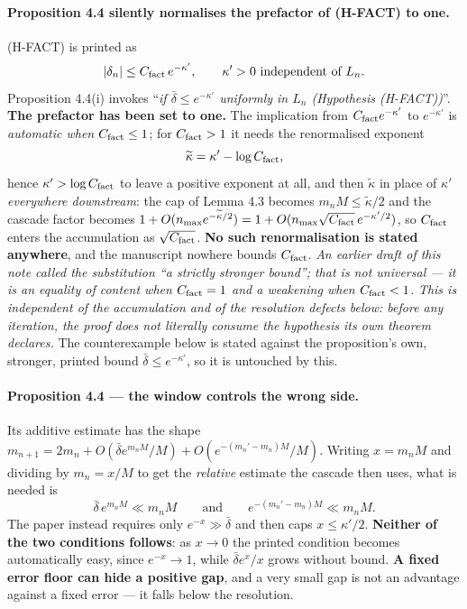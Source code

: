 \documentclass[11pt]{article}
\begin{document}
\paragraph{Proposition 4.4 silently normalises the prefactor of (H-FACT) to one.}
(H-FACT) is printed as
\[
|\delta_n|\le C_{\rm fact}\,e^{-\kappa'},\qquad
\kappa'>0\ \text{independent of }L_n .
\]
Proposition 4.4(i) invokes ``\emph{if $\bar\delta\le e^{-\kappa'}$ uniformly in $L_n$
(Hypothesis (H-FACT))}''. \textbf{The prefactor has been set to one.} The implication
from $C_{\rm fact}e^{-\kappa'}$ to $e^{-\kappa'}$ is \emph{automatic when
$C_{\rm fact}\le1$}; for $C_{\rm fact}>1$ it needs the renormalised exponent
\[
\widetilde\kappa=\kappa'-\log C_{\rm fact} ,
\]
hence \textbf{$\kappa'>\log C_{\rm fact}$} to leave a positive exponent at all, and then
$\widetilde\kappa$ in place of $\kappa'$ \emph{everywhere downstream}: the cap of
Lemma 4.3 becomes $m_nM\le\widetilde\kappa/2$ and the cascade factor becomes
$1+O(n_{\max}e^{-\widetilde\kappa/2})
=1+O(n_{\max}\sqrt{C_{\rm fact}}\,e^{-\kappa'/2})$, so $C_{\rm fact}$ enters the
accumulation as $\sqrt{C_{\rm fact}}$. \textbf{No such renormalisation is stated
anywhere}, and the manuscript nowhere bounds $C_{\rm fact}$. \emph{An earlier draft of
this note called the substitution ``a strictly stronger bound''; that is not universal
--- it is an equality of content when $C_{\rm fact}=1$ and a weakening when
$C_{\rm fact}<1$.}
\emph{This is independent of the accumulation and of the resolution defects below:
before any iteration, the proof does not literally consume the hypothesis its own
theorem declares.} The counterexample below is stated against the proposition's own,
stronger, printed bound $\bar\delta\le e^{-\kappa'}$, so it is untouched by this.

\paragraph{Proposition 4.4 --- the window controls the wrong side.} Its additive
estimate has the shape
$m_{n+1}=2m_n+O(\bar\delta e^{m_nM}/M)+O(e^{-(m_n'-m_n)M}/M)$. Writing $x=m_nM$ and
dividing by $m_n=x/M$ to get the \emph{relative} estimate the cascade then uses,
what is needed is
\[
\bar\delta\,e^{m_nM}\ll m_nM
\qquad\text{and}\qquad
e^{-(m_n'-m_n)M}\ll m_nM .
\]
The paper instead requires only
$e^{-x}\gg\bar\delta$ and then caps $x\le\kappa'/2$. \textbf{Neither of the two
conditions follows}: as $x\to0$ the printed condition becomes automatically easy,
since $e^{-x}\to1$, while $\bar\delta e^x/x$ grows without bound. \textbf{A fixed
error floor can hide a positive gap}, and a very small gap is not an advantage
against a fixed error --- it falls below the resolution.
\end{document}
